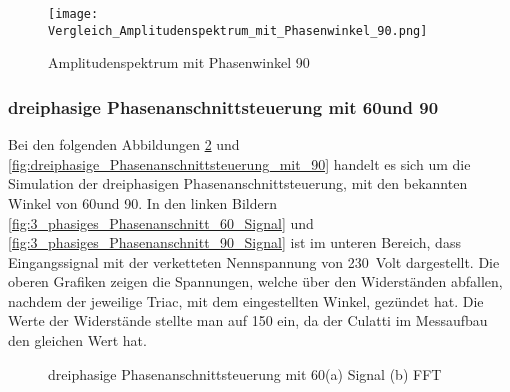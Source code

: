 \begin{figure}[ht!]
	\centering
	\texttt{[image: Vergleich\_Amplitudenspektrum\_mit\_Phasenwinkel\_90.png]}	
	\caption{Amplitudenspektrum mit Phasenwinkel 90\textdegree}
	\label{fig:Amplitudenspektrum mit Phasenwinkel 90grad}
\end{figure}









\newpage

\subsubsection{dreiphasige Phasenanschnittsteuerung mit 60\textdegree und 90\textdegree}


Bei den folgenden Abbildungen \ref{fig:dreiphasige_Phasenanschnittsteuerung_mit_60} und \ref{fig:dreiphasige_Phasenanschnittsteuerung_mit_90} handelt es sich um die Simulation der dreiphasigen Phasenanschnittsteuerung, mit den bekannten Winkel von 60\textdegree  und 90\textdegree.
In den linken Bildern \ref{fig:3_phasiges_Phasenanschnitt_60_Signal} und \ref{fig:3_phasiges_Phasenanschnitt_90_Signal} ist im  unteren Bereich, dass Eingangssignal mit der verketteten Nennspannung von \SI{230}{Volt} dargestellt. Die oberen Grafiken zeigen die Spannungen, welche über den Widerständen abfallen, nachdem der jeweilige Triac, mit dem eingestellten Winkel, gezündet hat. Die Werte der Widerstände stellte man auf \SI{150}{\Omega} ein, da der Culatti im Messaufbau den gleichen Wert hat. 

\begin{figure}[ht!]
	\centering
	\qquad
	\caption{dreiphasige Phasenanschnittsteuerung mit 60\textdegree (a) Signal (b) FFT}
	\label{fig:dreiphasige_Phasenanschnittsteuerung_mit_60}
\end{figure}


